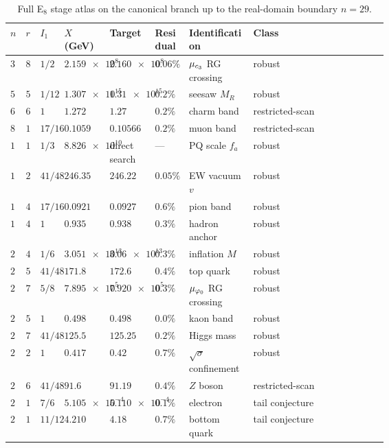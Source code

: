 \begin{table}[H]
\centering
\scriptsize
\setlength{\tabcolsep}{2pt}
\begin{tabularx}{\linewidth}{@{}>{\centering\arraybackslash}p{0.035\linewidth}>{\centering\arraybackslash}p{0.035\linewidth}>{\raggedright\arraybackslash}p{0.065\linewidth}>{\raggedleft\arraybackslash}p{0.12\linewidth}>{\raggedleft\arraybackslash}p{0.12\linewidth}>{\raggedright\arraybackslash}p{0.09\linewidth}>{\raggedright\arraybackslash}p{0.17\linewidth}Y@{}}
\toprule
$n$ & $r$ & $I_1$ & $X$ (GeV) & Target & Residual & Identification & Class \\
\midrule
$3$ & $8$ & $1/2$ & $\num{2.159e8}$ & $\num{2.160e8}$ & $0.06\%$ & $\mu_{c_3}$ RG crossing & robust \\
$5$ & $5$ & $1/12$ & $\num{1.307e15}$ & $\num{1.31e15}$ & $0.2\%$ & seesaw $M_R$ & robust \\
$6$ & $6$ & $1$ & $\num{1.272}$ & $\num{1.27}$ & $0.2\%$ & charm band & restricted-scan \\
$8$ & $1$ & $17/16$ & $\num{0.1059}$ & $\num{0.10566}$ & $0.2\%$ & muon band & restricted-scan \\
$10$ & $1$ & $1/3$ & $\num{8.826e10}$ & direct search & --- & PQ scale $f_a$ & robust \\
$12$ & $2$ & $41/48$ & $\num{246.35}$ & $\num{246.22}$ & $0.05\%$ & EW vacuum $v$ & robust \\
$14$ & $4$ & $17/16$ & $\num{0.0921}$ & $\num{0.0927}$ & $0.6\%$ & pion band & robust \\
$15$ & $4$ & $1$ & $\num{0.935}$ & $\num{0.938}$ & $0.3\%$ & hadron anchor & robust \\
$21$ & $4$ & $1/6$ & $\num{3.051e13}$ & $\num{3.06e13}$ & $0.3\%$ & inflation $M$ & robust \\
$21$ & $5$ & $41/48$ & $\num{171.8}$ & $\num{172.6}$ & $0.4\%$ & top quark & robust \\
$24$ & $7$ & $5/8$ & $\num{7.895e5}$ & $\num{7.920e5}$ & $0.3\%$ & $\mu_{\varphi_0}$ RG crossing & robust \\
$25$ & $5$ & $1$ & $\num{0.498}$ & $\num{0.498}$ & $0.0\%$ & kaon band & robust \\
$25$ & $7$ & $41/48$ & $\num{125.5}$ & $\num{125.25}$ & $0.2\%$ & Higgs mass & robust \\
$26$ & $2$ & $1$ & $\num{0.417}$ & $\num{0.42}$ & $0.7\%$ & $\sqrt{\sigma}$ confinement & robust \\
$27$ & $6$ & $41/48$ & $\num{91.6}$ & $\num{91.19}$ & $0.4\%$ & $Z$ boson & restricted-scan \\
$28$ & $1$ & $7/6$ & $\num{5.105e-4}$ & $\num{5.110e-4}$ & $0.1\%$ & electron & tail conjecture \\
$29$ & $1$ & $11/12$ & $\num{4.210}$ & $\num{4.18}$ & $0.7\%$ & bottom quark & tail conjecture \\
\bottomrule
\end{tabularx}
\caption{Full E$_8$ stage atlas on the canonical branch up to the real-domain boundary $n=29$.}
\label{tab:e8-full-atlas}
\end{table}

